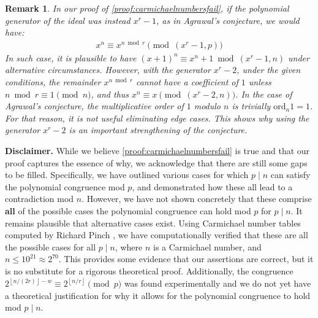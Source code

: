 \documentclass{article}
\theoremstyle{plain}
\newtheorem{remark}[theorem]{Remark}
\theoremstyle{definition}
\newcommand{\floor}[1]{\left\lfloor #1 \right\rfloor}
\newcommand{\ord}{\mathrm{ord}}
\begin{document}
\begin{remark}
In our proof of \cref{proof:carmichaelnumbersfail}, if the polynomial generator of the ideal was instead $x^r-1$, as in Agrawal's conjecture, we would have:
\begin{align*}
    x^n \equiv x^{n \bmod r} \pmod{(x^r-1, p)}
\end{align*}
In such case, it is plausible to have $(x+1)^n \equiv x^n + 1 \bmod{(x^r-1, n)}$ under alternative circumstances. However, with the generator $x^r-2$, under the given conditions, the remainder $x^{n \bmod r}$ cannot have a coefficient of $1$ unless $n \bmod r \equiv 1 \pmod{n}$, and thus $x^n \equiv x \pmod{(x^r-2,n)}$. In the case of Agrawal's conjecture, the multiplicative order of $1$ modulo $n$ is trivially $\ord_n 1 = 1$. For that reason, it is not useful eliminating edge cases. This shows why using the generator $x^r-2$ is an important strengthening of the conjecture.
\end{remark}

\textbf{Disclaimer.} While we believe \cref{proof:carmichaelnumbersfail} is true and that our proof captures the essence of why, we acknowledge that there are still some gaps to be filled. Specifically, we have outlined various cases for which $p \mid n$ can satisfy the polynomial congruence mod $p$, and demonstrated how these all lead to a contradiction mod $n$. However, we have not shown concretely that these comprise \textbf{all} of the possible cases the polynomial congruence can hold mod $p$ for $p \mid n$. It remains plausible that alternative cases exist. Using Carmichael number tables computed by Richard Pinch \cite{pinch2007carmichael}, we have computationally verified that these are all the possible cases for all $p \mid n$, where $n$ is a Carmichael number, and $n \leq 10^{21} \approx 2^{70}$. This provides some evidence that our assertions are correct, but it is no substitute for a rigorous theoretical proof. Additionally, the congruence $2^{\floor{n/(2r)} - w} \equiv 2^{\floor{n/r}} \pmod{p}$ was found experimentally and we do not yet have a theoretical justification for why it allows for the polynomial congruence to hold mod $p \mid n$.
\end{document}
